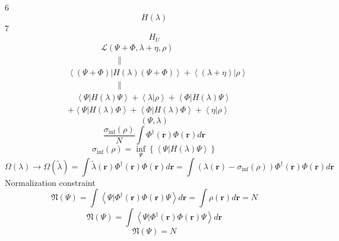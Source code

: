 \documentclass[prl,twocolumn]{revtex4}%
\begin{document}
6%
\[
H\left(  \lambda\right)
\]
7%
\[
H_{U}%
\]%
\begin{align*}
&  \left.  \qquad\right.  \left.  \qquad\right.  \mathcal{L}\left(  \Psi
+\Phi,\lambda+\eta,\rho\right) \\
&  \left.  \qquad\right.  \left.  \qquad\right.  \left.  \qquad\right.
\parallel\\
&  \left\langle \left(  \Psi+\Phi\right)  \left\vert H\left(  \lambda\right)
\right.  \left(  \Psi+\Phi\right)  \right\rangle +\left\langle \left(
\lambda+\eta\right)  \left\vert \rho\right.  \right\rangle \\
&  \left.  \qquad\right.  \left.  \qquad\right.  \left.  \qquad\right.
\parallel\\
&  \quad\left\langle \Psi\left\vert H\left(  \lambda\right)  \right.
\Psi\right\rangle +\left\langle \lambda\left\vert \rho\right.  \right\rangle
+\left\langle \Phi\left\vert H\left(  \lambda\right)  \right.  \Psi
\right\rangle \\
&  +\left\langle \Psi\left\vert H\left(  \lambda\right)  \right.
\Phi\right\rangle +\left\langle \Phi\left\vert H\left(  \lambda\right)
\right.  \Phi\right\rangle +\left\langle \eta\left\vert \rho\right.
\right\rangle
\end{align*}%
\[
\left(  \Psi,\lambda\right)
\]%
\[
\frac{\sigma_{\inf}\left(  \rho\right)  }{N}\int\Phi^{\dagger}\left(
\mathbf{r}\right)  \Phi\left(  \mathbf{r}\right)  d\mathbf{r}%
\]%
\[
\sigma_{\inf}\left(  \rho\right)  =\inf\limits_{\Psi}\left\{  \left\langle
\Psi\left\vert H\left(  \lambda\right)  \right.  \Psi\right\rangle \right\}
\]%
\[
\Omega\left(  \lambda\right)  \rightarrow\Omega\left(  \tilde{\lambda}\right)
=\int\tilde{\lambda}\left(  \mathbf{r}\right)  \Phi^{\dagger}\left(
\mathbf{r}\right)  \Phi\left(  \mathbf{r}\right)  d\mathbf{r=}\int\left(
\lambda\left(  \mathbf{r}\right)  -\sigma_{\inf}\left(  \rho\right)  \right)
\Phi^{\dagger}\left(  \mathbf{r}\right)  \Phi\left(  \mathbf{r}\right)
d\mathbf{r}%
\]
Normalization constraint%
\[
\mathfrak{N}\left(  \Psi\right)  =\int\left\langle \left.  \Psi\right\vert
\Phi^{\dagger}\left(  \mathbf{r}\right)  \Phi\left(  \mathbf{r}\right)
\Psi\right\rangle d\mathbf{r}=\int\rho\left(  \mathbf{r}\right)
d\mathbf{r}=N
\]%
\[
\mathfrak{N}\left(  \Psi\right)  =\int\left\langle \left.  \Psi\right\vert
\Phi^{\dagger}\left(  \mathbf{r}\right)  \Phi\left(  \mathbf{r}\right)
\Psi\right\rangle d\mathbf{r}%
\]%
\[
\mathfrak{N}\left(  \Psi\right)  =N
\]
%
\end{document}
